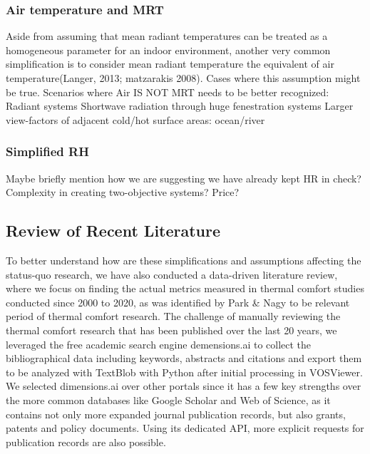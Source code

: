 \subsubsection{Air temperature and MRT}
        Aside from assuming that mean radiant temperatures can be treated as a homogeneous parameter for an indoor environment, another very common simplification is to consider mean radiant temperature the equivalent of air temperature\cite{kantor_most_2011}(Langer, 2013; matzarakis 2008). 
                Cases where this assumption might be true.
            Scenarios where Air IS NOT MRT needs to be better recognized:
            Radiant systems
            Shortwave radiation through huge fenestration systems
            Larger view-factors of adjacent cold/hot surface areas: ocean/river
\subsubsection{Simplified RH}
        Maybe briefly mention how we are suggesting we have already kept HR in check?
        Complexity in creating two-objective systems? Price?

\subsection{Review of Recent Literature}
    To better understand how are these simplifications and assumptions affecting the status-quo research, we have also conducted a data-driven literature review, where we focus on finding the actual metrics measured in thermal comfort studies conducted since 2000 to 2020, as was identified by Park \& Nagy \cite{park_comprehensive_2018} to be relevant period of thermal comfort research. The challenge of manually reviewing the thermal comfort research that has been published over the last 20 years, we leveraged the free academic search engine demensions.ai to collect the bibliographical data including keywords, abstracts and citations and export them to be analyzed with TextBlob with Python after initial processing in VOSViewer. We selected dimensions.ai over other portals since it has a few key strengths over the more common databases like Google Scholar and Web of Science, as it contains not only more expanded journal publication records, but also grants, patents and policy documents. Using its dedicated API, more explicit requests for publication records are also possible. 

